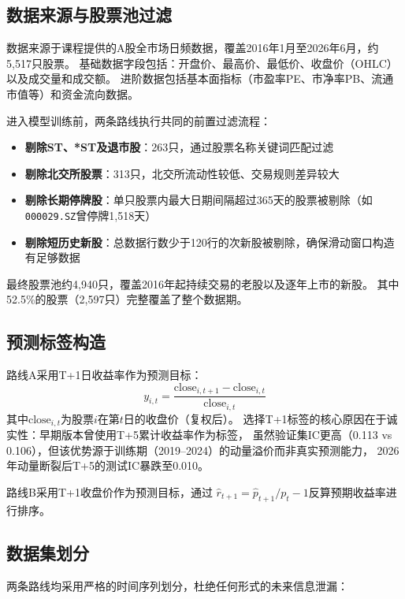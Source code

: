 \documentclass[12pt,a4paper]{ctexart}
\begin{document}
\subsection{数据来源与股票池过滤}

数据来源于课程提供的A股全市场日频数据，覆盖2016年1月至2026年6月，约5,517只股票。
基础数据字段包括：开盘价、最高价、最低价、收盘价（OHLC）以及成交量和成交额。
进阶数据包括基本面指标（市盈率PE、市净率PB、流通市值等）和资金流向数据。

进入模型训练前，两条路线执行共同的前置过滤流程：
\begin{itemize}[leftmargin=*]
    \item \textbf{剔除ST、*ST及退市股}：263只，通过股票名称关键词匹配过滤
    \item \textbf{剔除北交所股票}：313只，北交所流动性较低、交易规则差异较大
    \item \textbf{剔除长期停牌股}：单只股票内最大日期间隔超过365天的股票被剔除（如\verb|000029.SZ|曾停牌1,518天）
    \item \textbf{剔除短历史新股}：总数据行数少于120行的次新股被剔除，确保滑动窗口构造有足够数据
\end{itemize}

最终股票池约4,940只，覆盖2016年起持续交易的老股以及逐年上市的新股。
其中52.5\%的股票（2,597只）完整覆盖了整个数据期。

\subsection{预测标签构造}

路线A采用T+1日收益率作为预测目标：
\begin{equation}
    y_{i,t} = \frac{\text{close}_{i,t+1} - \text{close}_{i,t}}{\text{close}_{i,t}}
\end{equation}
其中$\text{close}_{i,t}$为股票$i$在第$t$日的收盘价（复权后）。
选择T+1标签的核心原因在于诚实性：早期版本曾使用T+5累计收益率作为标签，
虽然验证集IC更高（0.113 vs 0.106），但该优势源于训练期（2019--2024）的动量溢价而非真实预测能力，
2026年动量断裂后T+5的测试IC暴跌至0.010。

路线B采用T+1收盘价作为预测目标，通过
$\hat{r}_{t+1} = \hat{p}_{t+1} / p_t - 1$反算预期收益率进行排序。

\subsection{数据集划分}

两条路线均采用严格的时间序列划分，杜绝任何形式的未来信息泄漏：
\end{document}
